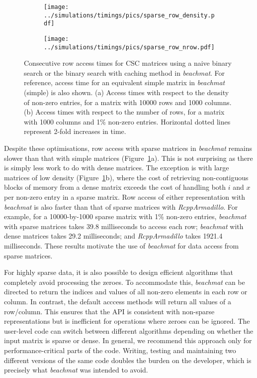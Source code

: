 \documentclass[10pt,letterpaper]{article}
\newcommand{\beachmat}{\textit{beachmat}}
\begin{document}
\begin{figure}[btp]
    \begin{subfigure}[b]{0.49\textwidth}
        \texttt{[image: ../simulations/timings/pics/sparse\_row\_density.pdf]}
        \caption{}
    \end{subfigure}
    \begin{subfigure}[b]{0.49\textwidth}
        \texttt{[image: ../simulations/timings/pics/sparse\_row\_nrow.pdf]}
        \caption{}
    \end{subfigure}
    \caption{Consecutive row access times for CSC matrices using a naive binary search or the binary search with caching method in \beachmat{}.
        For reference, access time for an equivalent simple matrix in \beachmat{} (simple) is also shown.
        (a) Access times with respect to the density of non-zero entries, for a matrix with 10000 rows and 1000 columns.
        (b) Access times with respect to the number of rows, for a matrix with 1000 columns and 1\% non-zero entries.
        Horizontal dotted lines represent 2-fold increases in time.
    }
    \label{fig:sparserow}
\end{figure}


Despite these optimisations, row access with sparse matrices in \beachmat{} remains slower than that with simple matrices (Figure~\ref{fig:sparserow}a).
This is not surprising as there is simply less work to do with dense matrices.
The exception is with large matrices of low density (Figure~\ref{fig:sparserow}b), where the cost of retrieving non-contiguous blocks of memory from a dense matrix exceeds the cost of handling both $i$ and $x$ per non-zero entry in a sparse matrix.
Row access of either representation with \beachmat{} is also faster than that of sparse matrices with \textit{RcppArmadillo}.
For example, for a 10000-by-1000 sparse matrix with 1\% non-zero entries, \beachmat{} with sparse matrices takes 39.8 milliseconds to access each row; \beachmat{} with dense matrices takes 29.2 milliseconds; and \textit{RcppArmadillo} takes 1921.4 milliseconds.
These results motivate the use of \beachmat{} for data access from sparse matrices.

For highly sparse data, it is also possible to design efficient algorithms that completely avoid processing the zeroes.
To accommodate this, \beachmat{} can be directed to return the indices and values of all non-zero elements in each row or column.
In contrast, the default acccess methods will return all values of a row/column.
This ensures that the API is consistent with non-sparse representations but is inefficient for operations where zeroes can be ignored.
The user-level code can switch between different algorithms depending on whether the input matrix is sparse or dense.
In general, we recommend this approach only for performance-critical parts of the code.
Writing, testing and maintaining two different versions of the same code doubles the burden on the developer, which is precisely what \beachmat{} was intended to avoid.
\end{document}
